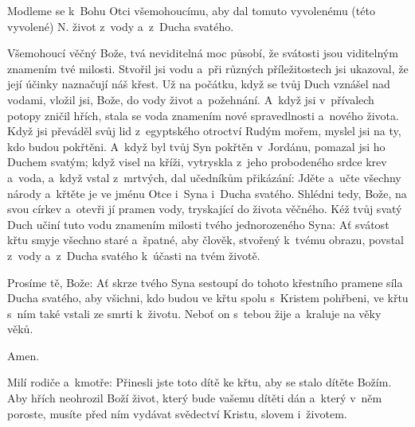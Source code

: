 
Modleme se k~Bohu Otci všemohoucímu, aby dal tomuto vyvolenému (této
vyvolené) {\color{red}N.} život z~vody a~z~Ducha svatého.


Všemohoucí věčný Bože, tvá neviditelná moc působí,
že svátosti jsou viditelným znamením tvé milosti.
Stvořil jsi vodu a~při různých příležitostech jsi ukazoval,
že její účinky naznačují náš křest.
Už na počátku, když se tvůj Duch vznášel nad vodami,
vložil jsi, Bože, do vody život a~požehnání.
A~když jsi v~přívalech potopy zničil hřích,
stala se voda znamením
nové spravedlnosti a~nového života.
Když jsi převáděl svůj lid
z~egyptského otroctví Rudým mořem,
myslel jsi na ty, kdo budou pokřtěni. 	
A~když byl tvůj Syn pokřtěn v~Jordánu,
pomazal jsi ho Duchem svatým;
když visel na kříži,
vytryskla z~jeho probodeného srdce krev a~voda,
a~když vstal z~mrtvých, dal učedníkům přikázání:
Jděte a~učte všechny národy a~křtěte je
ve jménu Otce i~Syna i~Ducha svatého.
Shlédni tedy, Bože, na svou církev
a~otevři jí pramen vody,
tryskající do života věčného.
Kéž tvůj svatý Duch učiní tuto vodu
znamením milosti tvého jednorozeného Syna:
Ať svátost křtu smyje všechno staré a~špatné,
aby člověk, stvořený k~tvému obrazu,
povstal z~vody a~z~Ducha svatého k~účasti na tvém životě. 	


Prosíme tě, Bože:
Ať skrze tvého Syna
sestoupí do tohoto křestního pramene síla Ducha svatého,
aby všichni, kdo budou ve křtu
spolu s~Kristem pohřbeni,
ve křtu s~ním také vstali ze smrti k~životu.
Neboť on s~tebou žije a~kraluje na věky věků.

 Amen.

\pars{}


Milí rodiče a~kmotře: Přinesli jste toto dítě ke křtu, aby se stalo dítěte Božím.
Aby hřích neohrozil Boží život, který bude vašemu dítěti dán a~který v~něm poroste,
musíte před ním vydávat svědectví Kristu, slovem i~životem.

